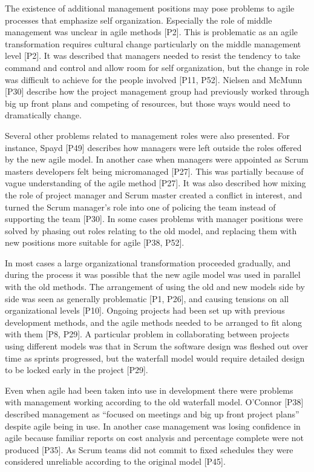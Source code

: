 \documentclass[preprint,authoryear,12pt]{elsarticle}
\begin{document}

The existence of additional management positions may pose problems to agile
processes that emphasize self organization.
Especially the role of middle management was unclear in agile methods [P2]. This
is problematic as an agile transformation requires cultural change particularly
on the middle management level [P2].
It was described that managers needed to resist the tendency to take command and
control and allow room for self organization, but the change in role was
difficult to achieve for the people involved [P11, P52].
Nielsen and McMunn [P30] describe how the project management group had
previously worked through big up front plans and competing of resources, but
those ways would need to dramatically change.

Several other problems related to management roles were also presented. For
instance, Spayd [P49] describes how managers were left outside the roles offered
by the new agile model. In another case when managers were appointed as Scrum
masters developers felt being micromanaged [P27]. This was partially because of
vague understanding of the agile method [P27]. It was also described how mixing
the role of project manager and Scrum master created a conflict in interest, and
turned the Scrum manager's role into one of policing the team instead of
supporting the team [P30]. In some cases problems with manager positions were
solved by phasing out roles relating to the old model, and replacing them with
new positions more suitable for agile [P38, P52].


In most cases a large organizational transformation proceeded gradually, and
during the process it was possible that the new agile model was used in parallel
with the old methods. The arrangement of using the old and new models side by
side was seen as generally problematic [P1, P26], and causing tensions on all
organizational levels [P10]. Ongoing projects had been set up with previous
development methods, and the agile methods needed to be arranged to fit along
with them [P8, P29]. A particular problem in collaborating between projects
using different models was that in Scrum the software design was fleshed out
over time as sprints progressed, but the waterfall model would require detailed
design to be locked early in the project [P29].

Even when agile had been taken into use in development there were problems with
management working according to the old waterfall model. O'Connor [P38]
described management as ``focused on meetings and big up front project plans''
despite agile being in use. In another case management was losing confidence in
agile because familiar reports on cost analysis and percentage complete were not
produced [P35]. As Scrum teams did not commit to fixed schedules they were
considered unreliable according to the original model [P45].
\end{document}
